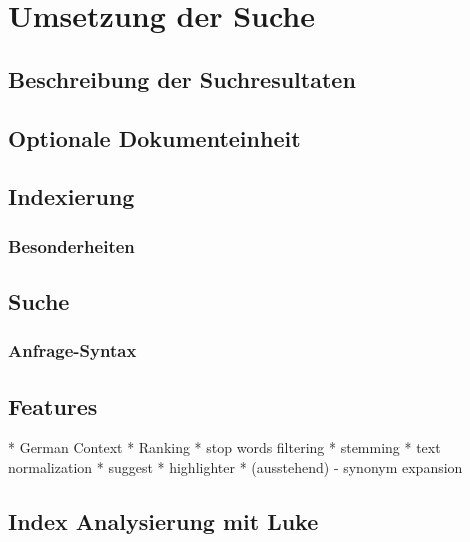 \chapter{Umsetzung der Suche}

\section{Beschreibung der Suchresultaten}

\section{Optionale Dokumenteinheit}

\section{Indexierung}
\subsection{Besonderheiten}


\section{Suche}
\subsection{Anfrage-Syntax}

\section{Features}

* German Context
* Ranking
* stop words filtering
* stemming
* text normalization
* suggest
* highlighter
* (ausstehend) - synonym expansion

\section{Index Analysierung mit Luke}
